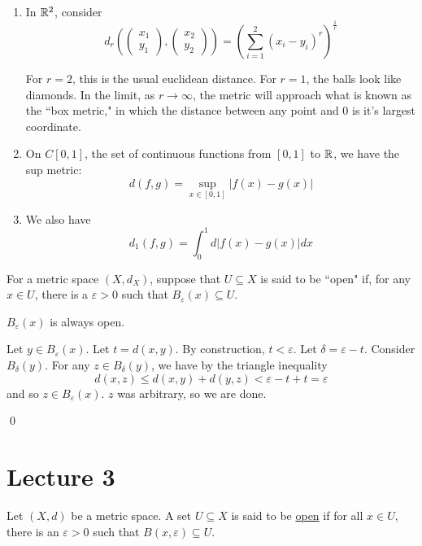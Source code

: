 \documentclass[x11names,reqno,14pt]{extarticle}
\begin{document}
\begin{enumerate}
\item In $\mathbb{R}^2$, consider 
\[
d_r\left(\begin{pmatrix} x_1 \\ y_1 \end{pmatrix}, \begin{pmatrix} x_2 \\ y_2 \end{pmatrix} \right) = \left(\sum_{i=1}^2 (x_i - y_i)^r\right)^{\frac{1}{r}}
\]

For $r = 2$, this is the usual euclidean distance. For $r = 1$, the balls look like diamonds. In the limit, as $r\to \infty$, the metric will approach what is known as the ``box metric," in which the distance between any point and 0 is it's largest coordinate. 
\item On $C[0, 1]$, the set of continuous functions from $[0, 1]$ to $\mathbb{R}$, we have the sup metric: 
\[
d(f, g) = \sup_{x\in[0, 1]}|f(x) - g(x)|
\]

\item We also have
\[
d_1(f, g) = \int_0^1d|f(x) - g(x)|dx
\]



\end{enumerate}


For a metric space $(X, d_X)$, suppose that $U \subseteq X$ is said to be ``open" if, for any $x \in U$, there is a $\varepsilon>0$ such that $B_\varepsilon(x) \subseteq U$. 

\lem 

$B_\varepsilon(x)$ is always open. 

\proof

Let $y \in B_\varepsilon(x)$. Let $t = d(x, y)$. By construction, $t <\varepsilon$. Let $\delta = \varepsilon - t$. Consider $B_\delta(y)$. For any $z \in B_\delta(y)$, we have by the triangle inequality
\[
d(x, z) \leq d(x, y) + d(y, z) < \varepsilon - t + t = \varepsilon
\]
and so $z \in B_\varepsilon(x)$. $z$ was arbitrary, so we are done.

\qed

\section*{Lecture 3}

 Let $(X, d)$ be a metric space. A set $U\subseteq X$ is said to be \underline{open} if for all $x \in U$, there is an $\varepsilon > 0$ such that $B(x, \varepsilon) \subseteq U$. 
\end{document}
